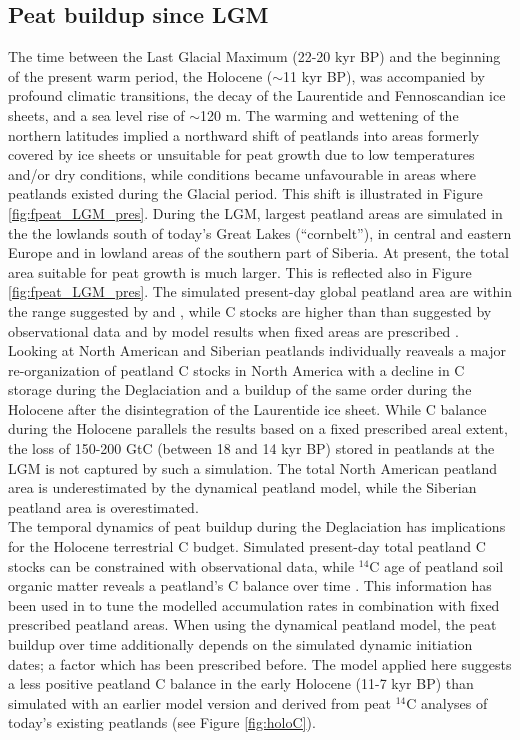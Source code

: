 \subsection{Peat buildup since LGM}
The time between the Last Glacial Maximum (22-20 kyr BP) and the beginning of the present warm period, the Holocene ($\sim$11 kyr BP), was accompanied by profound climatic transitions, the decay of the Laurentide and Fennoscandian ice sheets, and a sea level rise of $\sim$120 m. The warming and wettening of the northern latitudes implied a northward shift of peatlands into areas formerly covered by ice sheets or unsuitable for peat growth due to low temperatures and/or dry conditions, while conditions became unfavourable in areas where peatlands existed during the Glacial period. This shift is illustrated in Figure \ref{fig:fpeat_LGM_pres}. During the LGM, largest peatland areas are simulated in the the lowlands south of today's Great Lakes (``cornbelt''), in central and eastern Europe and in lowland areas of the southern part of Siberia. At present, the total area suitable for peat growth is much larger. This is reflected also in Figure \ref{fig:fpeat_LGM_pres}. The simulated present-day global peatland area are within the range suggested by \citet{yu10grl} and \citet{tarnocai09gbc}, while C stocks are higher than than suggested by observational data and by model results when fixed areas are prescribed \citep{spahni13cp}.\\

Looking at North American and Siberian peatlands individually reaveals a major re-organization of peatland C stocks in North America with a decline in C storage during the Deglaciation and a buildup of the same order during the Holocene after the disintegration of the Laurentide ice sheet. While C balance during the Holocene parallels the results based on a fixed prescribed areal extent, the loss of 150-200 GtC (between 18 and 14 kyr BP) stored in peatlands at the LGM is not captured by such a simulation. The total North American peatland area is underestimated by the dynamical peatland model, while the Siberian peatland area is overestimated.\\

The temporal dynamics of peat buildup during the Deglaciation has implications for the Holocene terrestrial C budget. Simulated present-day total peatland C stocks can be constrained with observational data, while $^{14}$C age of peatland soil organic matter reveals a peatland's C balance over time \citep{yu11hol}. This information has been used in \citet{spahni13cp} to tune the modelled accumulation rates in combination with fixed prescribed peatland areas. When using the dynamical peatland model, the peat buildup over time additionally depends on the simulated dynamic initiation dates; a factor which has been prescribed before. The model applied here suggests a less positive peatland C balance in the early Holocene (11-7 kyr BP) than simulated with an earlier model version and derived from peat $^{14}$C analyses of today's existing peatlands (see Figure \ref{fig:holoC}).

